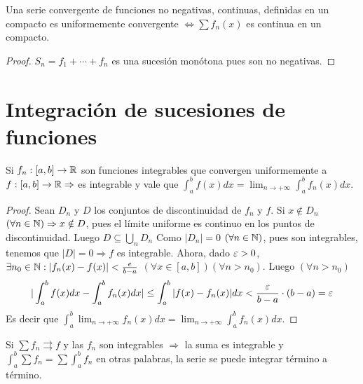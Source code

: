 \begin{corollary}
  Una serie convergente de funciones no negativas, continuas, definidas en un compacto es uniformemente convergente $\iff \sum f_n(x)$ es continua en un compacto.
  \begin{proof}
    $S_n = f_1 + \cdots + f_n$ es una sucesión monótona pues son no negativas.
  \end{proof}
\end{corollary}

\section{Integración de sucesiones de funciones}

\begin{theorem}
  Si $f_n: [a, b] \to \mathbb{R}$ son funciones integrables que convergen uniformemente a $f: [a, b] \to \mathbb{R} \Rightarrow$ es integrable y vale que $\int_a^b f(x) dx = \lim_{n \to +\infty} \int_a^b f_n(x) dx$.
  \begin{proof}
    Sean $D_n$ y $D$ los conjuntos de discontinuidad de $f_n$ y $f$. Si $x \notin D_n$ $(\forall n \in \mathbb{N}) \Rightarrow x \notin D$, pues el límite uniforme es continuo en los puntos de discontinuidad. Luego $D \subseteq \bigcup_n D_n$ Como $|D_n| = 0$ $(\forall n \in \mathbb{N})$, pues son integrables, tenemos que $|D| = 0 \Rightarrow f$ es integrable. Ahora, dado $\varepsilon > 0$, $\exists n_0 \in \mathbb{N} : |f_n(x) - f(x)| < \frac{e}{b-a}$ $(\forall x \in [a, b])(\forall n > n_0)$. Luego $(\forall n > n_0)$ \begin{equation} |\int_a^b f(x) dx - \int_a^b f_n(x) dx| \leq \int_a^b |f(x) - f_n(x)|dx < \frac{\varepsilon}{b-a} \cdot (b-a) = \varepsilon
    \end{equation}
    Es decir que $\int_a^b \lim_{n \to +\infty} f_n(x) dx = \lim_{n \to +\infty} \int_a^b f_n(x) dx$.
  \end{proof}
\end{theorem}

\begin{corollary}
  Si $\sum f_n \rightrightarrows f$ y las $f_n$ son integrables $\Rightarrow$ la suma es integrable y $\int_a^b \sum f_n = \sum \int_a^b f_n$ en otras palabras, la serie se puede integrar término a término.
\end{corollary}

